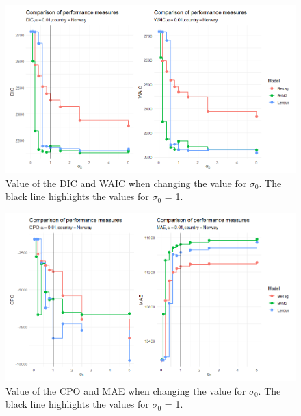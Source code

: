 \begin{figure}[H]
    \centering
    \includegraphics[width = \textwidth]{comparison_1_norway.png}
    \caption{Value of the DIC and WAIC when changing the value for $\sigma_0$. The black line highlights the values for $\sigma_0$ = 1.}
    \label{comparison_norway_1}
\end{figure}
%     
\begin{figure}[H]
    \centering
    \includegraphics[width = \textwidth]{comparison_2_norway.png}
    \caption{Value of the CPO and MAE when changing the value for $\sigma_0$. The black line highlights the values for $\sigma_0$ = 1.}
    \label{comparison_norway_2}
\end{figure}
